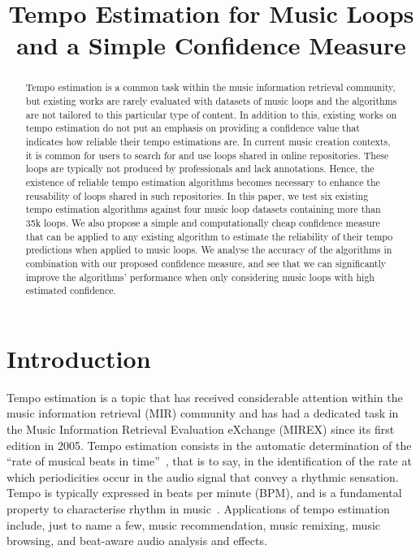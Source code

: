 \documentclass{article}
\title{Tempo Estimation for Music Loops and a Simple Confidence Measure}
\begin{document}
\maketitle

\begin{abstract}
Tempo estimation is a common task within the music information retrieval community, but existing works are rarely evaluated with datasets of music loops and the algorithms are not tailored to this particular type of content. In addition to this, existing works on tempo estimation do not put an emphasis on providing a confidence value that indicates how reliable their tempo estimations are. In current music creation contexts, it is common for users to search for and use loops shared in online repositories.
These loops are typically not produced by professionals and lack annotations. Hence, the existence of reliable tempo estimation algorithms becomes necessary to enhance the reusability of loops shared in such repositories. In this paper, we test six existing tempo estimation algorithms against four music loop datasets containing more than 35k loops. We also propose a simple and computationally cheap confidence measure that can be applied to any existing algorithm to estimate the reliability of their tempo predictions when applied to music loops. We analyse the accuracy of the algorithms in combination with our proposed confidence measure, and see that we can significantly improve the algorithms' performance when only considering music loops with high estimated confidence.
\end{abstract}

\section{Introduction}\label{sec:introduction}
Tempo estimation is a topic that has received considerable attention within the music information retrieval (MIR) community and has had a dedicated task in the Music Information Retrieval Evaluation eXchange (MIREX) since its first edition in 2005.
Tempo estimation consists in the automatic determination of the ``rate of musical beats in time''~\cite{Gouyon2006}, that is to say, in the identification of the rate at which periodicities occur in the audio signal that convey a rhythmic sensation.
Tempo is typically expressed in beats per minute (BPM), and is a fundamental property to characterise rhythm in music~\cite{Muller2015}. 
Applications of tempo estimation include, just to name a few, music recommendation, music remixing, music browsing, and beat-aware audio analysis and effects.
\end{document}
